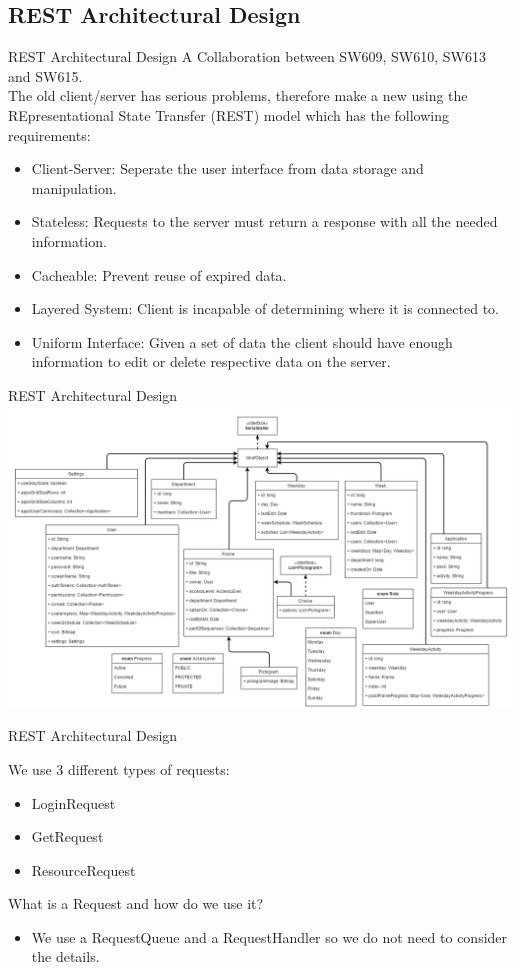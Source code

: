 \subsection{REST Architectural Design}
\begin{frame}{REST Architectural Design}
A Collaboration between SW609, SW610, SW613 and SW615.\\

The old client/server has serious problems, therefore make a new using the REpresentational State Transfer (REST) model which has the following requirements:
\begin{itemize}
\item Client-Server: Seperate the user interface from data storage and manipulation.
\item Stateless: Requests to the server must return a response with all the needed information.
\item Cacheable: Prevent reuse of expired data.
\item Layered System: Client is incapable of determining where it is connected to.
\item Uniform Interface: Given a set of data the client should have enough information to edit or delete respective data on the server.
\end{itemize}
\end{frame}

\begin{frame}{REST Architectural Design}
\includegraphics[scale=0.3]{figures/Giraf_RestModelV3.PNG}
\end{frame}

\begin{frame}{REST Architectural Design}

We use 3 different types of requests:
\begin{itemize}
\item LoginRequest
\item GetRequest
\item ResourceRequest
\end{itemize}

What is a Request and how do we use it?
\begin{itemize}
\item We use a RequestQueue and a RequestHandler so we do not need to consider the details.
\end{itemize}

\end{frame}

